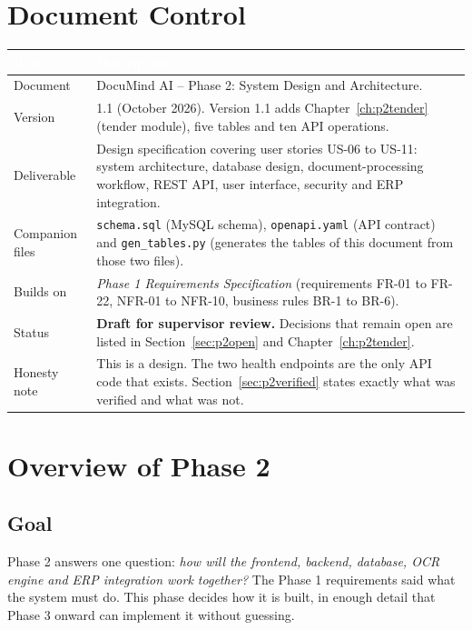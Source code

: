 \documentclass[11pt,a4paper]{report}
\newcommand{\projname}{DocuMind AI}
\newcommand{\hdr}[1]{\textcolor{white}{\sffamily\bfseries #1}}
\newcommand{\tblstart}{\rowcolors{2}{white}{rowgray}\arrayrulecolor{teal!60}}
\newcommand{\hdrrow}{\rowcolor{navy}}
\begin{document}
\chapter*{Document Control}
\tblstart\small
\begin{longtable}{L{3.4cm}L{11.0cm}}
\hdrrow \hdr{Item} & \hdr{Description}\\ \endhead
Document & \projname{} -- Phase 2: System Design and Architecture.\\
Version & 1.1 (October 2026). Version 1.1 adds Chapter~\ref{ch:p2tender} (tender module), five tables and ten API operations.\\
Deliverable & Design specification covering user stories US-06 to US-11: system architecture, database design, document-processing workflow, REST API, user interface, security and ERP integration.\\
Companion files & \texttt{schema.sql} (MySQL schema), \texttt{openapi.yaml} (API contract) and \texttt{gen\_tables.py} (generates the tables of this document from those two files).\\
Builds on & \emph{Phase 1 Requirements Specification} (requirements FR-01 to FR-22, NFR-01 to NFR-10, business rules BR-1 to BR-6).\\
Status & \textbf{Draft for supervisor review.} Decisions that remain open are listed in Section~\ref{sec:p2open} and Chapter~\ref{ch:p2tender}.\\
Honesty note & This is a design. The two health endpoints are the only API code that exists. Section~\ref{sec:p2verified} states exactly what was verified and what was not.\\
\hline
\end{longtable}
\clearpage
\tableofcontents
\clearpage
\listoffigures
\clearpage
{}
\setcounter{page}{1}

\newcommand{\nTables}{16}\newcommand{\nColumns}{146}\newcommand{\nOps}{34}\newcommand{\nPaths}{29}\newcommand{\nSchemas}{31}

\chapter{Overview of Phase 2}\label{ch:p2overview}
\section{Goal}
Phase 2 answers one question: \emph{how will the frontend, backend, database, OCR engine and ERP integration work together?} The Phase 1 requirements said what the system must do. This phase decides how it is built, in enough detail that Phase 3 onward can implement it without guessing.
\end{document}
